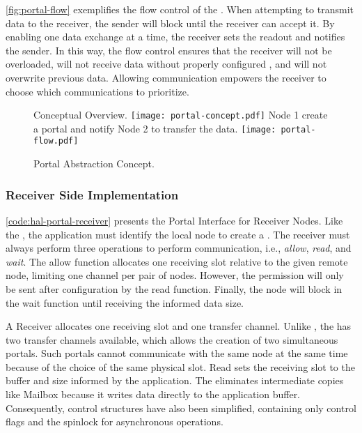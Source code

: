 			\autoref{fig:portal-flow} exemplifies the flow control of the \portal.
			When attempting to transmit data to the receiver, the sender will block
			until the receiver can accept it. By enabling one data exchange at a time,
			the receiver sets the readout and notifies the sender. In this way,
			the flow control ensures that the receiver will not be overloaded, will
			not receive data without properly configured \dma, and will not overwrite
			previous data. Allowing communication empowers the receiver to choose which
			communications to prioritize.

			\begin{figure}[!tb]
				\centering%
				\caption{Portal Abstraction Concept.}%
				\label{fig:portal}%

					{Conceptual Overview.}%
					{\texttt{[image: portal-concept.pdf]}}%
				\hspace{1cm}%
					{Node 1 create a portal and notify Node 2 to transfer the data.}%
					{\texttt{[image: portal-flow.pdf]}}%

			\end{figure}

			\subsubsection{Receiver Side Implementation}

				\autoref{code:hal-portal-receiver} presents the Portal Interface for
				Receiver Nodes. Like the \mailbox, the application must identify the
				local node to create a \portal. The receiver must always perform
				three operations to perform communication, i.e., \textit{allow},
				\textit{read}, and \textit{wait}. The allow function allocates one
				receiving slot relative to the given remote node, limiting one
				channel per pair of nodes. However, the permission will only be
				sent after \dma configuration by the read function. Finally, the
				node will block in the wait function until receiving the informed
				data size.

				A Receiver allocates one \dnoc receiving slot and one \cnoc transfer
				channel. Unlike \mailbox, the \portal has two transfer channels
				available, which allows the creation of two simultaneous portals.
				Such portals cannot communicate with the same node at the same time
				because of the choice of the same physical slot. Read sets the
				receiving slot to the buffer and size informed by the application.
				The \dma eliminates intermediate copies like Mailbox because it
				writes data directly to the application buffer. Consequently,
				control structures have also been simplified, containing only
				control flags and the spinlock for asynchronous operations.

